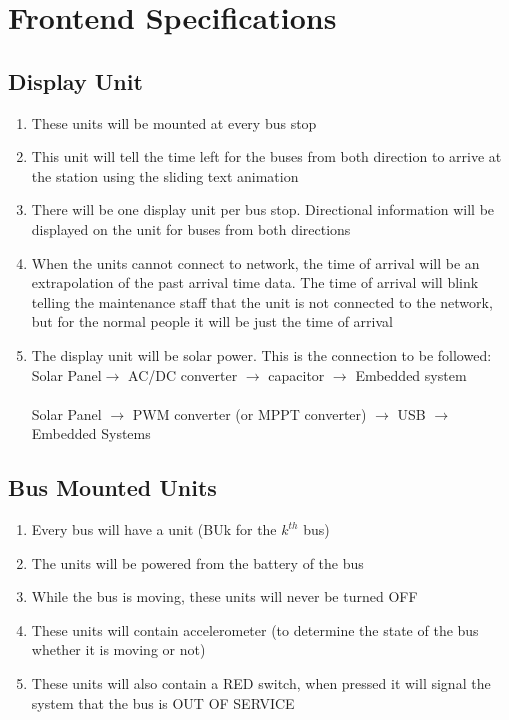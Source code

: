 \section{Frontend Specifications}
\subsection{Display Unit}
\begin{enumerate}
    \item These units will be mounted at every bus stop
    \item This unit will tell the time left for the buses from both direction to arrive at the station using the \gls{sliding text animation}
    \item There will be one display unit per bus stop. Directional information will be displayed on the unit for buses from both directions
    \item When the units cannot connect to network, the time of arrival will be an extrapolation of the past arrival time data. The time of arrival will blink telling the maintenance staff that the unit is not connected to the network, but for the normal people it will be just the time of arrival
    \item The display unit will be solar power. This is the connection to be followed: \\Solar Panel$\to$ AC/DC converter $\to$ capacitor $\to$ Embedded system \\ \\
          Solar Panel $\to$ \gls{PWM converter} (or \gls{MPPT converter}) $\to$ \ac{USB} $\to$ Embedded Systems
\end{enumerate}
\subsection{Bus Mounted Units}
\begin{enumerate}
    \item Every bus will have a unit (BUk for the $k^{th}$ bus)
    \item The units will be powered from the battery of the bus
    \item While the bus is moving, these units will never be turned OFF
    \item These units will contain \gls{accelerometer} (to determine the state of the bus whether it is moving or not)
    \item These units will also contain a RED switch, when pressed it will signal the system that the bus is OUT OF SERVICE
\end{enumerate}
